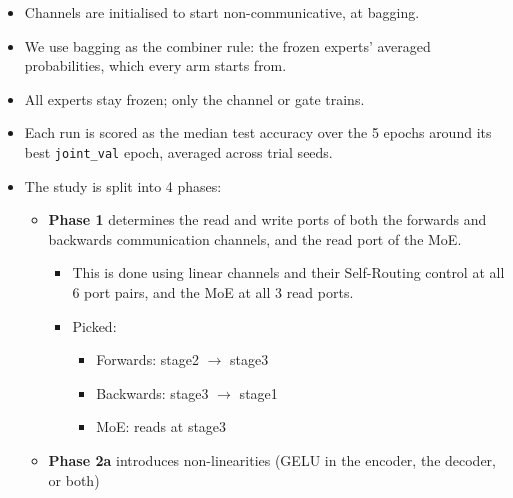 \documentclass[11pt,a4paper]{article}
\newcommand{\ra}{$\rightarrow$}
\begin{document}
\begin{itemize}
\begin{itemize}
\begin{itemize}
          \item Same as the Communicative Ensemble, but each expert receives the plain average of
                every expert's message, its own included (Q and K unused).
        \end{itemize}
      \item \textbf{Dense Soft-Gated Mixture of Experts}
        \begin{itemize}
          \item \emph{Gate:} each expert's feature map at the read port \ra{} linear \ra{} $r = 8$
                \ra{} concatenate ($3 \times 8$) \ra{} GELU \ra{} linear \ra{} 3 scores \ra{}
                softmax \ra{} weights on the experts' answer probabilities
        \end{itemize}
    \end{itemize}
  \item Channels are initialised to start non-communicative, at bagging.
  \item We use bagging as the combiner rule: the frozen experts' averaged probabilities, which
        every arm starts from.
  \item All experts stay frozen; only the channel or gate trains.
  \item Each run is scored as the median test accuracy over the 5 epochs around its best
        \texttt{joint\_val} epoch, averaged across trial seeds.
  \item The study is split into 4 phases:
    \begin{itemize}
      \item \textbf{Phase 1} determines the read and write ports of both the forwards and backwards
            communication channels, and the read port of the MoE.
        \begin{itemize}
          \item This is done using linear channels and their Self-Routing control at all 6 port
                pairs, and the MoE at all 3 read ports.
          \item Picked:
            \begin{itemize}
              \item Forwards: stage2 \ra{} stage3
              \item Backwards: stage3 \ra{} stage1
              \item MoE: reads at stage3
            \end{itemize}
        \end{itemize}
      \item \textbf{Phase 2a} introduces non-linearities (GELU in the encoder, the decoder, or both)

\end{itemize}
\end{itemize}
\end{document}
